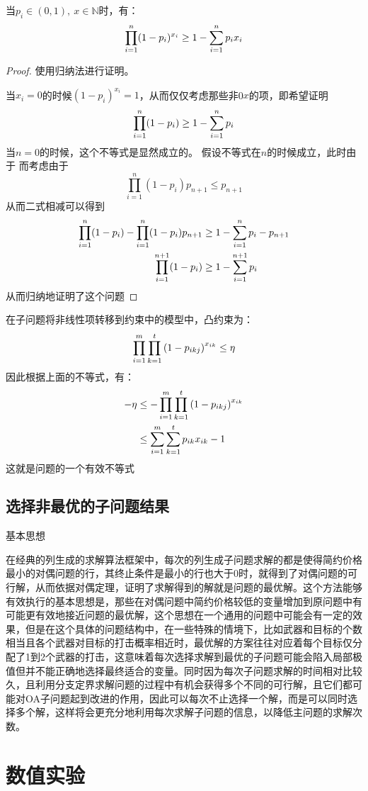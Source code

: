 \begin{proposition}
    当$p_i \in (0, 1),\ x \in \mathbb{N}$时，有： 
    \begin{equation*}
        \prod_{i=1}^{n}(1-p_i)^{x_i} \geq 1 - \sum_{i=1}^{n} p_i x_i
    \end{equation*}
\end{proposition}
\begin{proof}
    使用归纳法进行证明。

    当$x_i = 0$的时候$(1-p_i)^{x_i} = 1$，从而仅仅考虑那些非0$x$的项，即希望证明
    \begin{equation*}
        \prod_{i=1}^{n}(1-p_i) \geq 1 - \sum_{i=1}^{n} p_i
    \end{equation*}
    当$n=0$的时候，这个不等式是显然成立的。
    假设不等式在$n$的时候成立，此时由于
    而考虑由于
    \begin{equation*}
        \prod_{i=1}^{n}(1-p_i) p_{n+1} \leq p_{n+1}
    \end{equation*}
    从而二式相减可以得到
    \begin{align*}
        \prod_{i=1}^{n}(1-p_i) - \prod_{i=1}^{n}(1-p_i) p_{n+1} &\geq 1 - \sum_{i=1}^{n} p_i - p_{n+1} \\
        \prod_{i=1}^{n + 1}(1-p_i) &\geq 1 - \sum_{i=1}^{n + 1} p_i
    \end{align*}
    从而归纳地证明了这个问题
\end{proof}

在子问题将非线性项转移到约束中的模型中，凸约束为：
\begin{equation*}
    \prod_{i=1}^{m}{\prod_{k=1}^{t}{\left( 1-p_{ikj} \right) ^{x_{ik}}}} \leq \eta
\end{equation*}
因此根据上面的不等式，有：
\begin{align*}
	-\eta &\leq - \prod_{i=1}^{m}{\prod_{k=1}^{t}{\left( 1-p_{ikj} \right) ^{x_{ik}}}} \\ 
	&\leq \sum_{i=1}^{m}{\sum_{k=1}^{t}{p_{ik} x_{ik} - 1}}\\
\end{align*}
这就是问题的一个有效不等式


\subsection{选择非最优的子问题结果}
基本思想

在经典的列生成的求解算法框架中，每次的列生成子问题求解的都是使得简约价格最小的对偶问题的行，其终止条件是最小的行也大于0时，就得到了对偶问题的可行解，从而依据对偶定理，证明了求解得到的解就是问题的最优解。这个方法能够有效执行的基本思想是，那些在对偶问题中简约价格较低的变量增加到原问题中有可能更有效地接近问题的最优解，这个思想在一个通用的问题中可能会有一定的效果，但是在这个具体的问题结构中，在一些特殊的情境下，比如武器和目标的个数相当且各个武器对目标的打击概率相近时，最优解的方案往往对应着每个目标仅分配了1到2个武器的打击，这意味着每次选择求解到最优的子问题可能会陷入局部极值但并不能正确地选择最终适合的变量。同时因为每次子问题求解的时间相对比较久，且利用分支定界求解问题的过程中有机会获得多个不同的可行解，且它们都可能对OA子问题起到改进的作用，因此可以每次不止选择一个解，而是可以同时选择多个解，这样将会更充分地利用每次求解子问题的信息，以降低主问题的求解次数。

\section{数值实验}